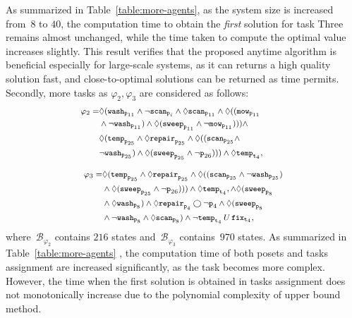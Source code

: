 As summarized in Table~\ref{table:more-agents},
as the system size is increased from~$8$ to $40$,
the computation time to obtain the \emph{first}
solution for task Three remains almost unchanged,
while the time taken to compute the optimal value increases slightly.
This result verifies that the proposed anytime algorithm is beneficial
especially for large-scale systems, as it can returns a high quality solution fast,
and close-to-optimal solutions can be returned as time permits.
Secondly, more tasks as $\varphi_2,\varphi_3$ are considered as follows:
\begin{equation}\footnotesize
\label{eq:task2}
\begin{aligned}
\varphi_2 = &\Diamond (\texttt{wash}_{\texttt{p}_{11}} \land \lnot\texttt{scan}_{\texttt{p}_i} \wedge\Diamond \texttt{scan}_{\texttt{p}_{11}}\wedge \Diamond ((\texttt{mow}_{\texttt{p}_{11}}\quad\quad\quad \\
&\wedge\lnot \texttt{wash}_{\texttt{p}_{11}} ) \wedge\Diamond (\texttt{sweep}_{\texttt{p}_{11}} \land \lnot\texttt{mow}_{\texttt{p}_{11}} )))\wedge\\
&\Diamond (\texttt{temp}_{\texttt{p}_{25}} \land \Diamond \texttt{repair}_{\texttt{p}_{25}}\wedge \Diamond ((\texttt{scan}_{\texttt{p}_{25}}\wedge\\
&\lnot \texttt{wash}_{\texttt{p}_{25}} ) \wedge\Diamond (\texttt{sweep}_{\texttt{p}_{25}} \land \lnot{\texttt{p}_{26}} ))) \wedge  \Diamond
\texttt{temp}_{\texttt{t}_4},
\end{aligned}
\end{equation}  

\begin{equation}\footnotesize
\label{eq:task3}
\begin{aligned}
\varphi_3 = &\Diamond (\texttt{temp}_{\texttt{p}_{25}} \land\Diamond \texttt{repair}_{\texttt{p}_{25}}
\wedge \Diamond ((\texttt{scan}_{\texttt{p}_{25}}\wedge
\lnot \texttt{wash}_{\texttt{p}_{25}} ) \\
&\wedge\Diamond (\texttt{sweep}_{\texttt{p}_{25}} \land \lnot{\texttt{p}_{26}} ))) \wedge  \Diamond
\texttt{temp}_{\texttt{t}_4},
\wedge  \Diamond (\texttt{sweep}_{\texttt{p}_{8}}\\& \wedge \Diamond \texttt{wash}_{\texttt{p}_{8}} )\land \Diamond \texttt{repair}_{\texttt{p}_4} \bigcirc \lnot \texttt{p}_4 \wedge \Diamond ( \texttt{sweep}_{\texttt{p}_{8}}\\
& \wedge \lnot \texttt{wash}_{\texttt{p}_{8}} \wedge\Diamond 
\texttt{scan}_{\texttt{p}_{8}} )\wedge \lnot \texttt{temp}_{\texttt{t}_4} \,U \, \texttt{fix}_{\texttt{t}_{4}},
\end{aligned}
\end{equation}
where~$\mathcal{B}_{\varphi_2}$ contains $216$ states
	 and~$\mathcal{B}_{\varphi_3}$ contains~$970$ states.
	As summarized in Table~\ref{table:more-agents} , the computation time of
	 both posets and tasks assignment are increased significantly, as the task becomes more
	 complex. 
	 However, the time when the first solution is obtained in tasks assignment does not monotonically increase due to
	 the polynomial complexity of upper bound method. 
 


